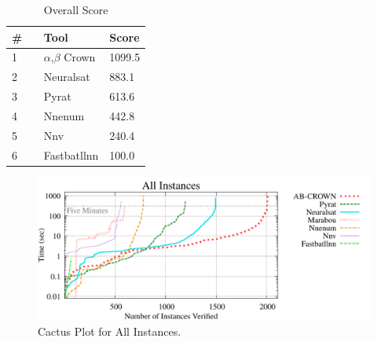 

\begin{table}[h]
\begin{center}
\caption{Overall Score} \label{tab:score}
{\setlength{\tabcolsep}{2pt}
\begin{tabular}[h]{@{}lll@{}}
\toprule
\textbf{\# ~} & \textbf{Tool} & \textbf{Score}\\
\midrule
1 & $\alpha$,$\beta$ Crown & 1099.5 \\
2 & Neuralsat & 883.1 \\
3 & Pyrat & 613.6 \\
4 & Nnenum & 442.8 \\
5 & Nnv & 240.4 \\
6 & Fastbatllnn & 100.0 \\
\bottomrule
\end{tabular}
}
\end{center}
\end{table}



\begin{figure}[h]
\centerline{\includegraphics[width=\textwidth]{cactus/all.pdf}}
\caption{Cactus Plot for All Instances.}
\label{fig:quantPic}
\end{figure}

